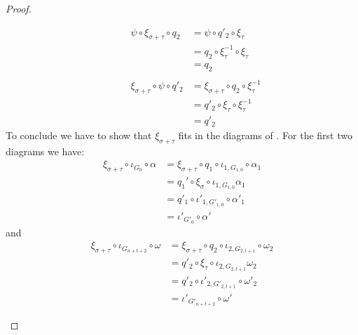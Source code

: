 \documentclass[a4paper,UKenglish,cleveref,pdftex, thm-restate,numberwithinsect]{lipics}
\begin{document}
\begin{proof}
\begin{itemize}
\[\begin{split}
\end{split}\qquad \begin{split}
	\psi \circ \xi_{\sigma+\tau}\circ  q_2&=\psi \circ q'_2\circ \xi_\tau \\&=q_2\circ \xi^{-1}_{\tau}\circ \xi_\tau\\&=q_2\\ \\ 	\xi_{\sigma+\tau}\circ \psi \circ q'_2&=\xi_{\sigma+\tau}\circ q_2\circ \xi^{-1}_\tau \\&=q'_2\circ \xi_{\tau}\circ \xi^{-1}_\tau\\&=q'_2
\end{split}\]
To conclude we have to show that $\xi_{\sigma+\tau}$ fits in the diagrams of . For the first two diagrams we have:
\begin{align*}
	\xi_{\sigma+\tau} \circ \iota_{G_{0}}\circ \alpha&=\xi_{\sigma+\tau} \circ q_1 \circ \iota_{1,G_{1,0}}\circ \alpha_1\\&=q_1'\circ \xi_\sigma \circ  \iota_{1,G_{1,0}} \alpha_1\\&=q'_1\circ \iota'_{1, G'_{1,0}}\circ \alpha'_1\\&=\iota'_{G'_0}\circ \alpha'
\end{align*} 
and
\begin{align*}
	\xi_{\sigma+\tau} \circ \iota_{G_{n+t+2}}\circ \omega&=\xi_{\sigma+\tau} \circ q_2 \circ \iota_{2,G_{2,t+1}}\circ \omega_2\\&=q'_2\circ \xi_\tau \circ  \iota_{2,G_{2,t+1}} \omega_2\\&=q'_2\circ \iota'_{2, G'_{2,t+1}}\circ \omega'_2\\&=\iota'_{G'_{n+t+2}}\circ \omega'
\end{align*}  


\end{itemize}
\end{proof}
\end{document}
